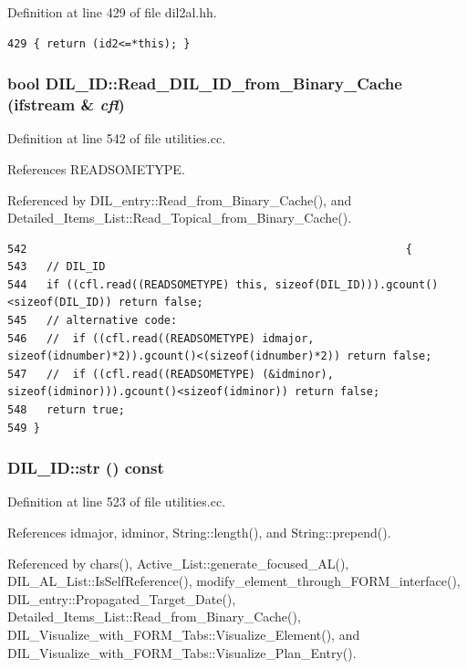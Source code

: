 Definition at line 429 of file dil2al.hh.



\footnotesize\begin{verbatim}429 { return (id2<=*this); }
\end{verbatim}\normalsize 
{}
\subsubsection{\setlength{\rightskip}{0pt plus 5cm}bool DIL\_\-ID::Read\_\-DIL\_\-ID\_\-from\_\-Binary\_\-Cache (ifstream \& {\em cfl})}\label{classDIL__ID_a19}




Definition at line 542 of file utilities.cc.

References READSOMETYPE.

Referenced by DIL\_\-entry::Read\_\-from\_\-Binary\_\-Cache(), and Detailed\_\-Items\_\-List::Read\_\-Topical\_\-from\_\-Binary\_\-Cache().



\footnotesize\begin{verbatim}542                                                          {
543   // DIL_ID
544   if ((cfl.read((READSOMETYPE) this, sizeof(DIL_ID))).gcount()<sizeof(DIL_ID)) return false;
545   // alternative code:
546   //  if ((cfl.read((READSOMETYPE) idmajor, sizeof(idnumber)*2)).gcount()<(sizeof(idnumber)*2)) return false;
547   //  if ((cfl.read((READSOMETYPE) (&idminor), sizeof(idminor))).gcount()<sizeof(idminor)) return false;
548   return true;
549 }
\end{verbatim}\normalsize 
{}
\subsubsection{ DIL\_\-ID::str () const}\label{classDIL__ID_a14}




Definition at line 523 of file utilities.cc.

References idmajor, idminor, String::length(), and String::prepend().

Referenced by chars(), Active\_\-List::generate\_\-focused\_\-AL(), DIL\_\-AL\_\-List::Is\-Self\-Reference(), modify\_\-element\_\-through\_\-FORM\_\-interface(), DIL\_\-entry::Propagated\_\-Target\_\-Date(), Detailed\_\-Items\_\-List::Read\_\-from\_\-Binary\_\-Cache(), DIL\_\-Visualize\_\-with\_\-FORM\_\-Tabs::Visualize\_\-Element(), and DIL\_\-Visualize\_\-with\_\-FORM\_\-Tabs::Visualize\_\-Plan\_\-Entry().



